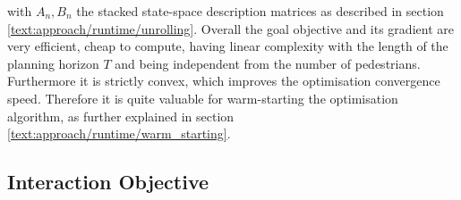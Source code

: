 with $A_n, B_n$ the stacked state-space description matrices as described in section \ref{text:approach/runtime/unrolling}. 
\newline
Overall the goal objective and its gradient are very efficient, cheap to compute, having linear complexity with the length of the planning horizon $T$ and being independent from the number of pedestrians. Furthermore it is strictly convex, which improves the optimisation convergence speed. Therefore it is quite valuable for warm-starting the optimisation algorithm, as further explained in section \ref{text:approach/runtime/warm_starting}.


\subsection{Interaction Objective}
\label{text:approach/objective/interactive}






